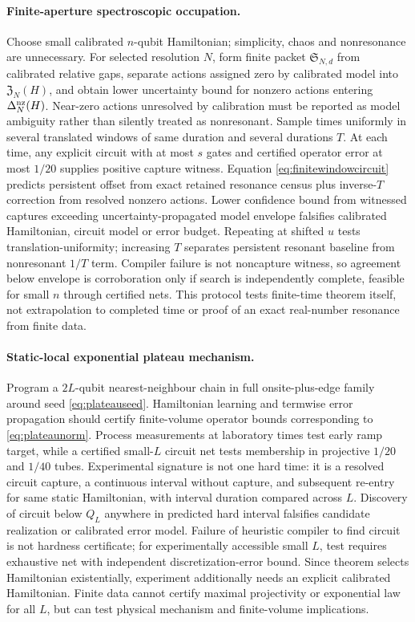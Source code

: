 \paragraph{Finite-aperture spectroscopic occupation.}
Choose small calibrated $n$-qubit Hamiltonian; simplicity, chaos and
nonresonance are unnecessary.
For selected resolution $N$, form finite packet
$\mathfrak S_{N,d}$ from calibrated relative gaps, separate actions assigned
zero by calibrated model into $\mathfrak Z_N(H)$, and obtain lower uncertainty
bound for nonzero actions entering $\Delta_N^{\rm nz}(H)$.  Near-zero actions
unresolved by calibration must be reported as model ambiguity rather than
silently treated as nonresonant.  Sample
times uniformly in several translated windows of same duration and several
durations $T$.  At each time, any explicit circuit with at most $s$ gates and
certified operator error at most $1/20$ supplies positive capture witness.
Equation \eqref{eq:finitewindowcircuit} predicts persistent offset from exact
retained resonance census plus inverse-$T$ correction from resolved nonzero
actions.  Lower confidence bound from witnessed captures exceeding
uncertainty-propagated model envelope falsifies calibrated Hamiltonian,
circuit model or error budget.  Repeating at shifted $u$ tests
translation-uniformity; increasing $T$ separates persistent resonant baseline
from nonresonant $1/T$ term.  Compiler failure is not noncapture witness, so
agreement below envelope is corroboration only if search is independently
complete, feasible for small $n$ through certified nets.  This protocol tests
finite-time theorem itself, not extrapolation to completed time or proof of
an exact real-number resonance from finite data.

\paragraph{Static-local exponential plateau mechanism.}
Program a $2L$-qubit nearest-neighbour chain in full onsite-plus-edge family
around seed \eqref{eq:plateauseed}.  Hamiltonian learning and termwise error
propagation should certify finite-volume operator bounds corresponding to
\eqref{eq:plateaunorm}.  Process measurements at laboratory times test early
ramp target, while a certified small-$L$ circuit net tests membership in
projective $1/20$ and $1/40$ tubes.  Experimental signature is not one hard
time: it is a resolved circuit capture, a continuous interval without capture,
and subsequent re-entry for same static Hamiltonian, with interval duration
compared across $L$.  Discovery of circuit below $Q_L$ anywhere in predicted
hard interval falsifies candidate realization or calibrated error model.
Failure of heuristic compiler to find circuit is not hardness certificate;
for experimentally accessible small $L$, test requires exhaustive net with
independent discretization-error bound.  Since theorem selects Hamiltonian
existentially, experiment additionally needs an explicit calibrated
Hamiltonian.  Finite data cannot certify maximal projectivity or exponential law
for all $L$, but can test physical mechanism and finite-volume implications.

